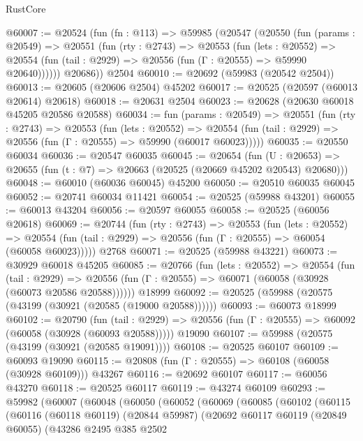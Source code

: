 \begin{lexlean}{RustCore}
\begin{coremodule}
@60007 := @20524
    (fun (fn : @113) =>
    @59985
      (@20547
        (@20550
          (fun (params : @20549) =>
          @20551
            (fun (rty : @2743) =>
            @20553
              (fun (lets : @20552) =>
              @20554 (fun (tail : @2929) => @20556 (fun (Γ : @20555) => @59990 @20640))))))
        @20686))
    @2504
@60010 := @20692 (@59983 (@20542 @2504))
@60013 := @20605 (@20606 @2504) @45202
@60017 := @20525 (@20597 (@60013 @20614) @20618)
@60018 := @20631 @2504
@60023 := @20628 (@20630 @60018 @45205 @20586 @20588)
@60034 := fun (params : @20549) =>
  @20551
    (fun (rty : @2743) =>
    @20553
      (fun (lets : @20552) =>
      @20554 (fun (tail : @2929) => @20556 (fun (Γ : @20555) => @59990 (@60017 @60023)))))
@60035 := @20550 @60034
@60036 := @20547 @60035
@60045 := @20654
    (fun (U : @20653) => @20655 (fun (t : @7) => @20663 (@20525 (@20669 @45202 @20543) @20680)))
@60048 := @60010 (@60036 @60045) @45200
@60050 := @20510 @60035 @60045
@60052 := @20741 @60034 @11421
@60054 := @20525 (@59988 @43201)
@60055 := @60013 @43204
@60056 := @20597 @60055
@60058 := @20525 (@60056 @20618)
@60069 := @20744
    (fun (rty : @2743) =>
    @20553
      (fun (lets : @20552) =>
      @20554 (fun (tail : @2929) => @20556 (fun (Γ : @20555) => @60054 (@60058 @60023)))))
    @2768
@60071 := @20525 (@59988 @43221)
@60073 := @30929 @60018 @45205
@60085 := @20766
    (fun (lets : @20552) =>
    @20554
      (fun (tail : @2929) =>
      @20556 (fun (Γ : @20555) => @60071 (@60058 (@30928 (@60073 @20586 @20588))))))
    @18999
@60092 := @20525 (@59988 (@20575 (@43199 (@30921 (@20585 (@19000 @20588))))))
@60093 := @60073 @18999
@60102 := @20790
    (fun (tail : @2929) => @20556 (fun (Γ : @20555) => @60092 (@60058 (@30928 (@60093 @20588)))))
    @19090
@60107 := @59988 (@20575 (@43199 (@30921 (@20585 @19091))))
@60108 := @20525 @60107
@60109 := @60093 @19090
@60115 := @20808 (fun (Γ : @20555) => @60108 (@60058 (@30928 @60109))) @43267
@60116 := @20692 @60107
@60117 := @60056 @43270
@60118 := @20525 @60117
@60119 := @43274 @60109
@60293 := @59982
    (@60007
      (@60048
        (@60050
          (@60052
            (@60069
              (@60085
                (@60102
                  (@60115
                    (@60116
                      (@60118 @60119)
                      (@20844 @59987)
                      (@20692
                        @60117
                        @60119
                        (@20849 @60055)
                        (@43286
                          @2495
                          @385
                          @2502

\end{coremodule}
\end{lexlean}
